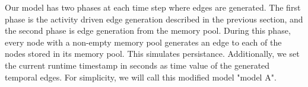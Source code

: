 \documentclass[../../thesis.tex]{subfiles}
\begin{document}
Our model has two phases at each time step where edges are generated. The first phase is the activity driven edge generation described in the previous section, and the second phase is edge generation from the memory pool. During this phase, every node with a non-empty memory pool generates an edge to each of the nodes stored in its memory pool. This simulates persistance. Additionally, we set the current runtime timestamp in seconds as time value of the generated temporal edges. For simplicity, we will call this modified model "model A".






\end{document}
